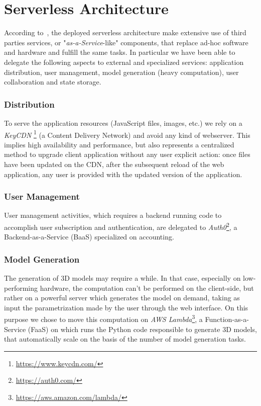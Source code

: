 \section{Serverless Architecture}\label{sec:architecture}

According to~\cite{Roberts}, the deployed serverless architecture make extensive use of third parties services, or "\emph{as-a-Service}-like" components, that replace ad-hoc software and hardware and fulfill the same tasks. In particular we have been able to delegate the following aspects to external and specialized services: application distribution, user management, model generation (heavy computation), user collaboration and state storage.


\subsubsection*{Distribution}

To serve the application resources (JavaScript files, images, etc.) we rely on a \emph{KeyCDN} \footnote{\url{https://www.keycdn.com/}} (a Content Delivery Network) and avoid any kind of webserver. This implies high availability and performance, but also represents a centralized method to upgrade client application without any user explicit action: once files have been updated on the CDN, after the subsequent reload of the web application, any user is provided with the updated version of the application.

\subsubsection*{User Management}

User management activities, which requires a backend running code to accomplish user subscription and authentication, are delegated to \emph{Auth0}\footnote{\url{https://auth0.com/}}, a Backend-as-a-Service (BaaS) specialized on accounting.

\subsubsection*{Model Generation}

The generation of 3D models may require a while. In that case, especially on low-performing hardware, the computation can't be performed on the client-side, but rather on a powerful server which generates the model on demand, taking as input the parametrization made by the user through the web interface. On this purpose we chose to move this computation on \emph{AWS Lambda}\footnote{\url{https://aws.amazon.com/lambda/}}, a Function-as-a-Service (FaaS) on which runs the Python code responsible to generate 3D models, that automatically scale on the basis of the number of model generation tasks.

